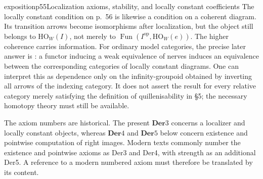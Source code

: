 \begin{dcomment}{exposition}{p55}{Localization axioms, stability, and locally constant coefficients}
The locally constant condition on p.~56 is likewise a condition on a coherent diagram. Its transition arrows become isomorphisms after localization, but the object still belongs to $\mathrm{HO}_W(I)$, not merely to $\operatorname{Fun}(I^{\mathrm{op}},\mathrm{HO}_W(e))$. The higher coherence carries information. For ordinary model categories, the precise later answer is \citet[Theorem 1.3]{Cisinski2009LocallyConstant}: a functor inducing a weak equivalence of nerves induces an equivalence between the corresponding categories of locally constant diagrams. One can interpret this as dependence only on the infinity-groupoid obtained by inverting all arrows of the indexing category. It does not assert the result for every relative category merely satisfying the definition of quillenisability in \S5; the necessary homotopy theory must still be available.

The axiom numbers are historical. The present $\mathbf{Der}3$ concerns a localizer and locally constant objects, whereas $\mathbf{Der}4$ and $\mathbf{Der}5$ below concern existence and pointwise computation of right images. Modern texts commonly number the existence and pointwise axioms as Der3 and Der4, with strength as an additional Der5. A reference to a modern numbered axiom must therefore be translated by its content.
\end{dcomment}


